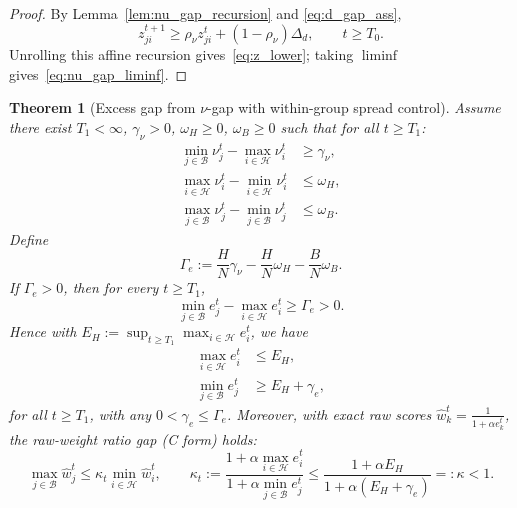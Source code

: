 \documentclass[11pt,a4paper]{article}
\newtheorem{theorem}{Theorem}
\theoremstyle{remark}
\newcommand{\HH}{\mathcal{H}}
\newcommand{\BB}{\mathcal{B}}
\begin{document}
\begin{proof}
By Lemma~\ref{lem:nu_gap_recursion} and \eqref{eq:d_gap_ass},
\[
    z_{ji}^{t+1}\ge \rho_\nu z_{ji}^t + (1-\rho_\nu)\Delta_d,
    \qquad t\ge T_0.
\]
Unrolling this affine recursion gives~\eqref{eq:z_lower}; taking
\(\liminf\) gives~\eqref{eq:nu_gap_liminf}.
\end{proof}

\begin{theorem}[Excess gap from \(\nu\)-gap with within-group spread control]
\label{thm:excess_from_d}
Assume there exist \(T_1<\infty\), \(\gamma_\nu>0\), \(\omega_H\ge 0\),
\(\omega_B\ge 0\) such that for all \(t\ge T_1\):
\begin{align}
    \min_{j\in\BB}\nu_j^t - \max_{i\in\HH}\nu_i^t &\ge \gamma_\nu,
    \label{eq:nu_gap_ass}\\
    \max_{i\in\HH}\nu_i^t - \min_{i\in\HH}\nu_i^t &\le \omega_H,
    \label{eq:nu_h_spread}\\
    \max_{j\in\BB}\nu_j^t - \min_{j\in\BB}\nu_j^t &\le \omega_B.
    \label{eq:nu_b_spread}
\end{align}
Define
\[
    \Gamma_e
    :=
    \frac{H}{N}\gamma_\nu - \frac{H}{N}\omega_H - \frac{B}{N}\omega_B.
\]
If \(\Gamma_e>0\), then for every \(t\ge T_1\),
\begin{equation}
    \min_{j\in\BB} e_j^t - \max_{i\in\HH} e_i^t
    \ge
    \Gamma_e
    > 0.
    \label{eq:e_gap_ass}
\end{equation}
Hence with
\(E_H:=\sup_{t\ge T_1}\max_{i\in\HH}e_i^t\), we have
\begin{align}
    \max_{i\in\HH} e_i^t &\le E_H, \label{eq:e_h_bound}\\
    \min_{j\in\BB} e_j^t &\ge E_H+\gamma_e, \label{eq:e_b_bound}
\end{align}
for all \(t\ge T_1\), with any \(0<\gamma_e\le \Gamma_e\).
Moreover, with exact raw scores
\(\hat w_k^t=\frac{1}{1+\alpha e_k^t}\), the raw-weight ratio gap (C form)
holds:
\begin{equation}
    \max_{j\in\BB}\hat w_j^t
    \le
    \kappa_t \min_{i\in\HH}\hat w_i^t,
    \qquad
    \kappa_t
    :=
    \frac{1+\alpha \max_{i\in\HH}e_i^t}
         {1+\alpha \min_{j\in\BB}e_j^t}
    \le
    \frac{1+\alpha E_H}{1+\alpha(E_H+\gamma_e)}
    =:\kappa<1.
    \label{eq:raw_ratio_gap}
\end{equation}
\end{theorem}
\end{document}
